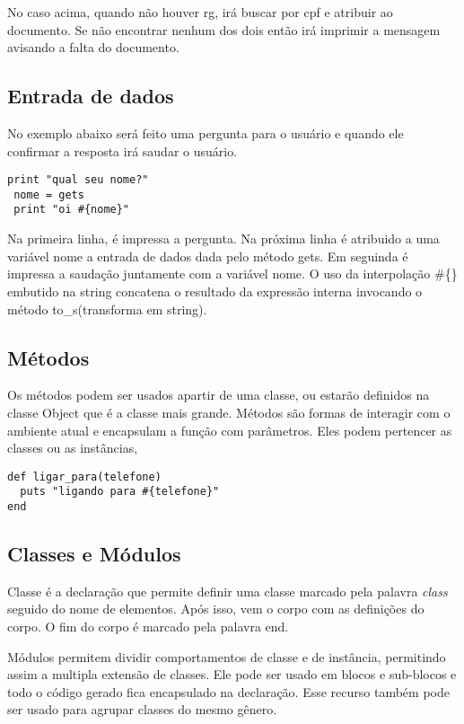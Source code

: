 \documentclass[espaco=simples,appendix=Name]{abnt}
\begin{document}
No caso acima, quando não houver rg, irá buscar por cpf e atribuir ao documento. Se não encontrar nenhum dos dois então irá imprimir a mensagem avisando a falta do documento.

\subsection { Entrada de dados }

No exemplo abaixo será feito uma pergunta para o usuário e quando ele confirmar a resposta irá saudar o usuário.

\begin{lstlisting}[caption=Exemplo de entrada de dados ]
 print "qual seu nome?"
 nome = gets
 print "oi #{nome}"
\end{lstlisting}
 
Na primeira linha, é impressa a pergunta. Na próxima linha é atribuido a uma variável nome a entrada de dados dada pelo método gets.
Em seguinda é impressa a saudação juntamente com a variável nome. O uso da interpolação \#\{\} embutido na string concatena o resultado da expressão interna invocando o método to\_s(transforma em string).

\subsection { Métodos }

Os métodos podem ser usados apartir de uma classe, ou estarão definidos na classe Object que é a classe mais grande. Métodos são formas de interagir com o ambiente atual e encapsulam a função com parâmetros. Eles podem pertencer as classes ou as instâncias, 

\begin{lstlisting}[caption=Exemplo de método ]
def ligar_para(telefone)
  puts "ligando para #{telefone}"
end
\end{lstlisting}

\subsection { Classes e Módulos }
 
Classe é a declaração que permite definir uma classe marcado pela palavra \textit{class} seguido do nome de elementos. Após isso, vem o corpo com as definições do corpo. O fim do corpo é marcado pela palavra end.

Módulos permitem dividir comportamentos de classe e de instância, permitindo assim a multipla extensão de classes. Ele pode ser usado em blocos e sub-blocos e todo o código gerado fica encapsulado na declaração. Esse recurso também pode ser usado para agrupar classes do mesmo gênero. 
\end{document}
